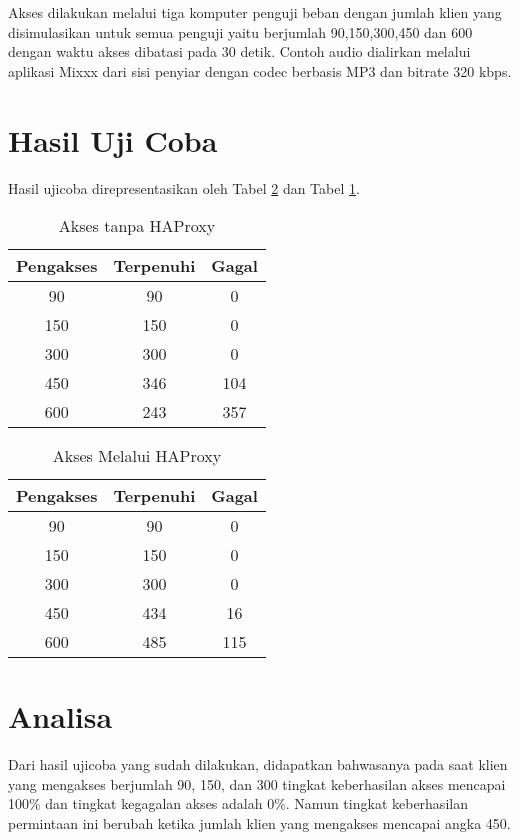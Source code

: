Akses dilakukan melalui tiga komputer penguji beban dengan jumlah klien yang disimulasikan untuk semua penguji yaitu berjumlah 90,150,300,450 dan 600 dengan waktu akses dibatasi pada 30 detik. Contoh audio dialirkan melalui aplikasi Mixxx dari sisi penyiar dengan codec berbasis MP3 dan bitrate 320 kbps.


\section{Hasil Uji Coba}

Hasil ujicoba direpresentasikan oleh Tabel \ref{tab:haproxy} dan Tabel \ref{tab:nohaproxy}.
\begin{table}[h]
	\centering
	\caption{Akses tanpa HAProxy}
	\begin{tabular}{|c|c|c|}
		\hline
		\textbf{Pengakses} & \textbf{Terpenuhi} & \textbf{Gagal} \\ \hline
		90 & 90 & 0 \\ \hline
		150 & 150 & 0 \\ \hline
		300 & 300 & 0 \\ \hline
		450 & 346 & 104 \\ \hline
		600 & 243 & 357 \\ \hline
	\end{tabular}
	
	\label{tab:nohaproxy}
\end{table}


\begin{table}[h]
	\centering
	\caption{Akses Melalui HAProxy}
	\begin{tabular}{|c|c|c|}
		\hline
		\textbf{Pengakses} & \textbf{Terpenuhi} & \textbf{Gagal} \\ \hline
		90 & 90 & 0 \\ \hline
		150 & 150 & 0 \\ \hline
		300 & 300 & 0 \\ \hline
		450 & 434 & 16 \\ \hline
		600 & 485 & 115 \\ \hline
	\end{tabular}
	
	\label{tab:haproxy}
\end{table}


\section{Analisa}
	Dari hasil ujicoba yang sudah dilakukan, didapatkan bahwasanya pada saat klien yang mengakses berjumlah 90, 150, dan 300 tingkat keberhasilan akses mencapai 100\% dan tingkat kegagalan akses adalah 0\%. Namun tingkat keberhasilan permintaan ini berubah ketika jumlah klien yang mengakses mencapai angka 450.
	
